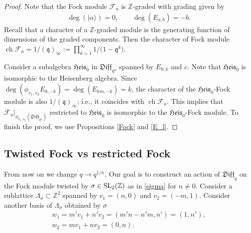 \documentclass[pdftex]{sigma}
\numberwithin{equation}{section}
\theoremstyle{definition}
\newcommand{\qd}[1]{ \mathfrak{Diff}_{q^{#1}} }
\newcommand{\qD}{\mathfrak{Diff}_q}
\newcommand{\Hem}{\mathfrak{Heis}}
\DeclareMathOperator{\ch}{ch}
\begin{document}
\begin{proof}
Note that the Fock module $\mathcal{F}_u$ is $\mathbb{Z}$-graded with grading given by
\begin{gather*}
\deg(| \alpha \rangle) = 0, \qquad \deg (E_{a,b})=-b.
\end{gather*}
Recall that a character of a $\mathbb{Z}$-graded module is the generating function of dimensions of the graded components. Then the character of Fock module $\ch \mathcal{F}_u = 1/(\mathfrak{q})_{ \infty } := \prod\limits_{k=1}^{\infty} 1/\big(1-\mathfrak{q}^k\big)$.

Consider a subalgebra $\Hem_0$ in $\qd{n}$ spanned by $E_{0, k}$ and $c$. Note that $\Hem_0$ is isomorphic to the Heisenberg algebra. Since $\deg (\phi_{v_1,v_2}E_{0,-k} )= \deg (E_{km,-k}) = k$, the character of the $\Hem_0$-Fock module is also $1/(\mathfrak{q})_{\infty}$; i.e., it coincides with $\ch \mathcal{F}_u$. This implies that $\left. \mathcal{F}_u \right|_{\phi_{v_1, v_2} \left(\qd{n} \right)}$ restricted to $\Hem_0$ is isomorphic to the $\Hem_0$-Fock module. To finish the proof, we use Propositions \ref{Fock} and \ref{E_l}.
\end{proof}

\subsection{Twisted Fock vs restricted Fock}
From now on we change $q \rightarrow q^{1/n}$.
Our goal is to construct an action of $\qD$ on the Fock module twisted by $\sigma \in {\rm SL}_2 ( \mathbb{Z} )$ as in \eqref{sigma} for $n \neq 0$. Consider a sublattice $\Lambda_{\sigma} \subset \mathbb{Z}^2$ spanned by $v_1 = (n,0)$ and $v_2 = (-m, 1)$. Consider another basis of $\Lambda_{\sigma}$ obtained by $\sigma$
\begin{gather}
w_1= m' v_1 + n' v_2 = (m' n - n' m, n') = (1, n'), \label{eq: v to w change 1} \\
w_2= m v_1 + n v_2 = (0, n). \label{eq: v to w change 2}
\end{gather}
\end{document}
